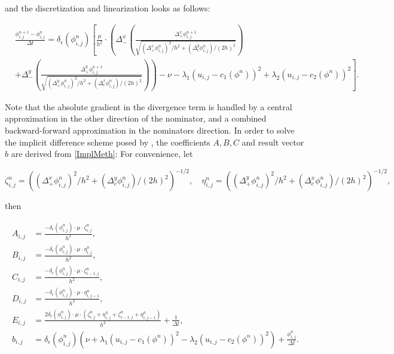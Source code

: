 and the discretization and linearization looks as follows:

\begin{equation}
  \begin{split}
    &\frac{\phi_{i,j}^{n+1}-\phi_{i,j}^n}{\Delta t} = \delta_\epsilon(\phi_{i,j}^n) \left[\frac{\mu}{h^2}\cdot 
\left(\Delta_-^x \left(\frac{\Delta_+^x\phi_{i,j}^{n+1}}{\sqrt{(\Delta_+^x\phi_{i,j}^n)^2/h^2 + (\Delta_c^y \phi_{i,j}^n)/(2h)^2}}\right)\right.\right.\\
    &\left.\left.+ \Delta_-^y \left(\frac{\Delta_+^y\phi_{i,j}^{n+1}}{\sqrt{(\Delta_+^y\phi_{i,j}^n)^2/h^2 + (\Delta_c ^x \phi_{i,j}^n)/(2h)^2}}\right)\right)
    - \nu - \lambda_1(u_{i,j} - c_1(\phi^n))^2 + \lambda_2(u_{i,j} - c_2(\phi^n))^2\right].
  \end{split}\label{ImplMeth}
\end{equation}

Note that the absolute gradient in the divergence term is handled by a central approximation in the other direction of the nominator, and a combined backward-forward approximation in the nominators direction.
In order to solve the implicit difference scheme posed by \cite{chan.01}, the coefficients $A,B,C$ and result vector $b$ are derived from \eqref{ImplMeth}:
For convenience, let

\begin{equation}
\zeta_{i,j}^n = \left((\Delta_+^x\phi_{i,j}^n)^2/h^2 + (\Delta_c^y \phi_{i,j}^n)/(2h)^2\right)^{-1/2},\quad
\eta_{i,j}^n = \left((\Delta_+^y\phi_{i,j}^n)^2/h^2 + (\Delta_c ^x \phi_{i,j}^n)/(2h)^2\right)^{-1/2},\label{zetaeta}
\end{equation}

then

\begin{align*}
A_{i,j} &= \frac{-\delta_\epsilon(\phi_{i,j}^n)\cdot\mu\cdot \zeta_{i,j}^n}{h^2},\\
B_{i,j} &= \frac{-\delta_\epsilon(\phi_{i,j}^n)\cdot\mu\cdot\eta_{i,j}^n}{h^2},\\
C_{i,j} &= \frac{-\delta_\epsilon(\phi_{i,j}^n)\cdot\mu\cdot \zeta_{i-1,j}^n}{h^2},\\
D_{i,j} &= \frac{-\delta_\epsilon(\phi_{i,j}^n)\cdot\mu\cdot\eta_{i,j-1}^n}{h^2},\\
E_{i,j} &= \frac{2\delta_\epsilon(\phi_{i,j}^n)\cdot\mu\cdot(\zeta_{i,j}^n + \eta_{i,j}^n + \zeta_{i-1,j}^n +\eta_{i,j-1}^n)}{h^2}+\frac{1}{\Delta t},\\
b_{i,j} &= \delta_\epsilon(\phi_{i,j}^n)\left(\nu + \lambda_1(u_{i,j}-c_1(\phi^n))^2 - \lambda_2(u_{i,j}-c_2(\phi^n))^2\right) + \frac{\phi_{i,j}^n}{\Delta t}.
\end{align*}

